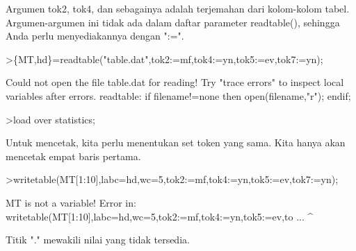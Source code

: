 \documentclass[12pt,arial,letterpaper]{book}
\begin{document}
\begin{eulercomment}
\begin{eulercomment}
\begin{eulercomment}
\begin{eulercomment}
\begin{eulercomment}
\begin{eulercomment}
\begin{eulercomment}
\begin{eulercomment}
\begin{eulercomment}
\begin{eulercomment}
\begin{eulercomment}
\begin{eulercomment}
\begin{eulercomment}
\begin{eulercomment}
\begin{eulercomment}
\begin{eulercomment}
\begin{eulercomment}
\begin{eulercomment}
\begin{eulercomment}
\begin{eulercomment}
\begin{eulercomment}
\begin{eulercomment}
\begin{eulercomment}
\begin{eulercomment}
\begin{eulercomment}
\begin{eulercomment}
\begin{eulercomment}
\begin{eulercomment}
\begin{eulercomment}
\begin{eulercomment}
\begin{eulercomment}
\begin{eulercomment}
\begin{eulercomment}
Argumen tok2, tok4, dan sebagainya adalah terjemahan dari kolom-kolom
tabel. Argumen-argumen ini tidak ada dalam daftar parameter
readtable(), sehingga Anda perlu menyediakannya dengan ":=".
\end{eulercomment}
\begin{eulerprompt}
>\{MT,hd\}=readtable("table.dat",tok2:=mf,tok4:=yn,tok5:=ev,tok7:=yn);
\end{eulerprompt}
\begin{euleroutput}
  Could not open the file
  table.dat
  for reading!
  Try "trace errors" to inspect local variables after errors.
  readtable:
      if filename!=none then open(filename,"r"); endif;
\end{euleroutput}
\begin{eulerprompt}
>load over statistics;
\end{eulerprompt}
\begin{eulercomment}
Untuk mencetak, kita perlu menentukan set token yang sama. Kita hanya
akan mencetak empat baris pertama.
\end{eulercomment}
\begin{eulerprompt}
>writetable(MT[1:10],labc=hd,wc=5,tok2:=mf,tok4:=yn,tok5:=ev,tok7:=yn);
\end{eulerprompt}
\begin{euleroutput}
  MT is not a variable!
  Error in:
  writetable(MT[1:10],labc=hd,wc=5,tok2:=mf,tok4:=yn,tok5:=ev,to ...
                     ^
\end{euleroutput}
\begin{eulercomment}
Titik "." mewakili nilai yang tidak tersedia.


\end{eulercomment}
\end{eulercomment}
\end{eulercomment}
\end{eulercomment}
\end{eulercomment}
\end{eulercomment}
\end{eulercomment}
\end{eulercomment}
\end{eulercomment}
\end{eulercomment}
\end{eulercomment}
\end{eulercomment}
\end{eulercomment}
\end{eulercomment}
\end{eulercomment}
\end{eulercomment}
\end{eulercomment}
\end{eulercomment}
\end{eulercomment}
\end{eulercomment}
\end{eulercomment}
\end{eulercomment}
\end{eulercomment}
\end{eulercomment}
\end{eulercomment}
\end{eulercomment}
\end{eulercomment}
\end{eulercomment}
\end{eulercomment}
\end{eulercomment}
\end{eulercomment}
\end{eulercomment}
\end{eulercomment}
\end{document}
